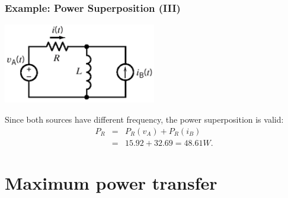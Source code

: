 \documentclass{beamer}
\begin{document}
\begin{frame}[fragile]
\frametitle{Example: Power Superposition (III)}

\begin{center}
\includegraphics[width=0.5\textwidth]{src/super_example1.png}
\end{center}

Since both sources have different frequency,
the power superposition is valid:
\begin{eqnarray}
P_R &=& P_R(v_A) + P_R(i_B)
\nonumber \\
&=& 15.92 + 32.69 = 48.61 W
\nonumber.
\end{eqnarray}


\end{frame}

\section{Maximum power transfer}
\end{document}

